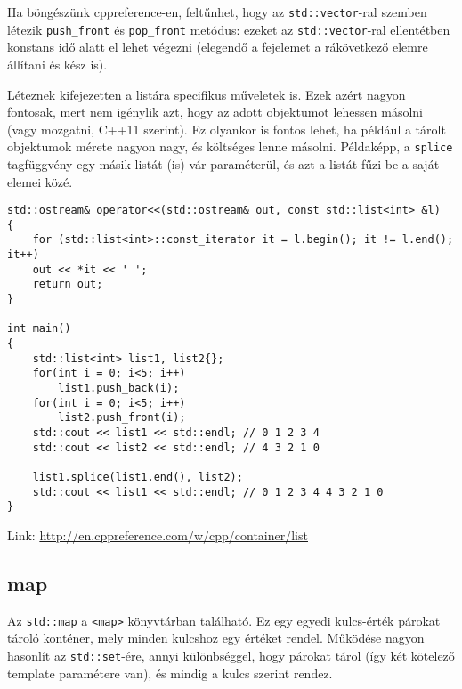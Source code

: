 \documentclass[../cpp_book/cpp_book.tex]{subfiles}
\begin{document}
	\medskip
	Ha böngészünk cppreference-en, feltűnhet, hogy az \texttt{std::vector}-ral szemben létezik \texttt{push\_front} és \texttt{pop\_front} metódus: ezeket az \texttt{std::vector}-ral ellentétben konstans idő alatt el lehet végezni (elegendő a fejelemet a rákövetkező elemre állítani és kész is).
	\medskip
	
	Léteznek kifejezetten a listára specifikus műveletek is. Ezek azért nagyon fontosak, mert nem igénylik azt, hogy az adott objektumot lehessen másolni (vagy mozgatni, C++11 szerint). Ez olyankor is fontos lehet, ha például a tárolt objektumok mérete nagyon nagy, és költséges lenne másolni. Példaképp, a \texttt{splice} tagfüggvény egy másik listát (is) vár paraméterül, és azt a listát fűzi be a saját elemei közé.
\begin{lstlisting}
std::ostream& operator<<(std::ostream& out, const std::list<int> &l)
{
	for (std::list<int>::const_iterator it = l.begin(); it != l.end(); it++)
	out << *it << ' ';
	return out;
}	

int main()
{
	std::list<int> list1, list2{};
	for(int i = 0; i<5; i++)
		list1.push_back(i); 
	for(int i = 0; i<5; i++)
		list2.push_front(i);
	std::cout << list1 << std::endl; // 0 1 2 3 4
	std::cout << list2 << std::endl; // 4 3 2 1 0 
	
	list1.splice(list1.end(), list2);
	std::cout << list1 << std::endl; // 0 1 2 3 4 4 3 2 1 0
}
\end{lstlisting}
	Link: \url{http://en.cppreference.com/w/cpp/container/list}
	\subsection{map}
	Az \texttt{std::map} a \texttt{<map>} könyvtárban található. Ez egy egyedi kulcs-érték párokat tároló konténer, mely minden kulcshoz egy értéket rendel. Működése nagyon hasonlít az \texttt{std::set}-ére, annyi különbséggel, hogy párokat tárol (így két kötelező template paramétere van), és mindig a kulcs szerint rendez.
	\smallskip
	
\end{document}
